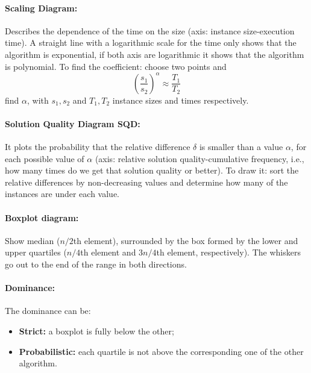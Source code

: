 \documentclass{article}
\begin{document}
	\paragraph{Scaling Diagram:} Describes the dependence of the time on the size (axis: instance size-execution time). A straight line with a logarithmic scale for the time only shows that the algorithm is exponential, if both axis are logarithmic it shows that the algorithm is polynomial. To find the coefficient: choose two points and 
	$$ \left(\frac{s_1}{s_2}\right)^\alpha \approx \frac{T_1}{T_2}$$
	find $\alpha$, with $s_1, s_2$ and $T_1, T_2$ instance sizes and times respectively.\\
	
	\paragraph{Solution Quality Diagram SQD:} It plots the probability that the relative difference $\delta$ is smaller than a value $\alpha$, for each possible value of $\alpha$ (axis: relative solution quality-cumulative frequency, i.e., how many times do we get that solution quality or better). To draw it: sort the relative differences by non-decreasing values and determine how many of the instances are under each value.\\
	
	\paragraph{Boxplot diagram:} Show median ($n/2$th element), surrounded by the box formed by the lower and upper quartiles ($n/4$th element and $3n/4$th element, respectively). The whiskers go out to the end of the range in both directions.\\
	
	\paragraph{Dominance:} The dominance can be: 
	\begin{itemize}
		\item \textbf{Strict:} a boxplot is fully below the other;
		\item \textbf{Probabilistic:} each quartile is not above the corresponding one of the other algorithm.\\
	\end{itemize}
	
\end{document}

